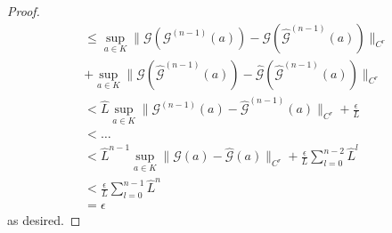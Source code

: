 \documentclass[10pt,a4paper]{amsart}
\newcommand{\G}{\mathcal{G}}
\begin{document}
\begin{proof}
\begin{align*}
        &\leq \sup_{a \in K} \|\G (\G^{(n-1)}(a)) - \G(\hat{\G}^{(n-1)}(a))\|_{C^r} \\
         &+ \sup_{a \in K} \|\G(\hat{\G}^{(n-1)}(a)) - \hat{\G}(\hat{\G}^{(n-1)}(a))\|_{C^r} \\
        &< \hat{L} \sup_{a \in K} \|\G^{(n-1)}(a) - \hat{\G}^{(n-1)}(a)\|_{C^r} + \frac{\epsilon}{L} \\
        &< \dots \\
        &< \hat{L}^{n-1} \sup_{a \in K} \|\G(a) - \hat{\G}(a)\|_{C^r} + \frac{\epsilon}{L} \sum_{l=0}^{n-2} \hat{L}^l \\
        &< \frac{\epsilon}{L} \sum_{l=0}^{n-1} \hat{L}^n \\
        &= \epsilon
    \end{align*}
    as desired.
\end{proof}
\end{document}
